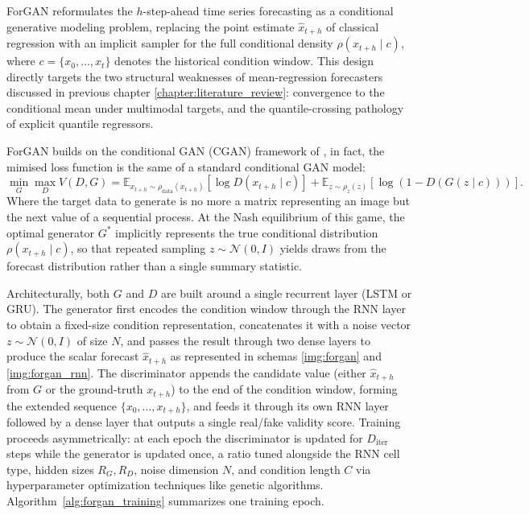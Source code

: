 ForGAN \cite{background:forgan} reformulates the $h$-step-ahead time series forecasting as a conditional generative modeling problem,
replacing the point estimate $\hat{x}_{t+h}$ of classical regression with an implicit sampler for the full conditional density $\rho(x_{t+h} \mid c)$, where $c = \{x_0, \dots, x_t\}$ denotes the historical condition window. 
This design directly targets the two structural weaknesses of 
mean-regression forecasters discussed in previous chapter \ref{chapter:literature_review}: convergence to the conditional mean under multimodal targets, and the quantile-crossing pathology of explicit quantile regressors.

ForGAN builds on the conditional GAN (CGAN) framework of \cite{background:cgan}, 
in fact, the mimised loss function is the same of a standard conditional GAN model:
\begin{equation*}
\min_G \max_D V(D,G) = \mathbb{E}_{x_{t+h} \sim \rho_{\text{data}}(x_{t+h})}[\log D(x_{t+h} \mid c)] + \mathbb{E}_{z \sim \rho_z(z)}[\log(1 - D(G(z \mid c)))].
\end{equation*}
Where the target data to generate is no more a matrix representing an image but the next value of a sequential process.
At the Nash equilibrium of this game, the optimal generator $G^*$ implicitly represents the true conditional distribution 
$\rho(x_{t+h}\mid c)$, so that repeated sampling $z \sim \mathcal{N}(0, I)$ yields draws from the forecast distribution rather than a single summary statistic.

Architecturally, both $G$ and $D$ are built around a single recurrent layer (LSTM or GRU). 
The generator first encodes the condition window through the RNN layer to 
obtain a fixed-size condition representation, 
concatenates it with a noise vector 
$z \sim \mathcal{N}(0, I)$ of size $N$, 
and passes the result through two dense 
layers to produce the scalar forecast $\hat{x}_{t+h}$ as represented in schemas \ref{img:forgan} and \ref{img:forgan_rnn}. 
The discriminator appends the candidate value (either $\hat{x}_{t+h}$ from $G$ or the ground-truth $x_{t+h}$) 
to the end of the condition window, 
forming the extended sequence $\{x_0,\dots,x_{t+h}\}$, 
and feeds it through its own RNN layer followed by a dense 
layer that outputs a single real/fake validity score. 
Training proceeds asymmetrically: at each epoch the discriminator 
is updated for $D_{\text{iter}}$ steps while the generator
 is updated once, a ratio tuned alongside the RNN cell type, 
 hidden sizes $R_G, R_D$, noise dimension $N$, and condition length $C$ via hyperparameter optimization techniques like genetic algorithms. 
 Algorithm~\ref{alg:forgan_training} summarizes one training epoch.

